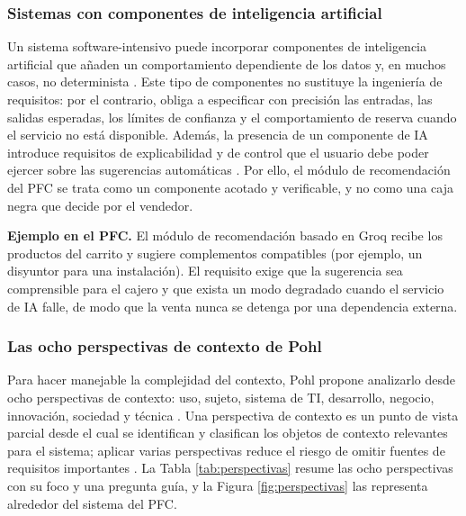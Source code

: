 \documentclass[onecolumn,12pt]{IEEEtran}
\begin{document}
\subsubsection{Sistemas con componentes de inteligencia artificial}
Un sistema software-intensivo puede incorporar componentes de inteligencia artificial que a\~naden un comportamiento dependiente de los datos y, en muchos casos, no determinista \cite{pohl2025,swebok4}. Este tipo de componentes no sustituye la ingenier\'ia de requisitos: por el contrario, obliga a especificar con precisi\'on las entradas, las salidas esperadas, los l\'imites de confianza y el comportamiento de reserva cuando el servicio no est\'a disponible. Adem\'as, la presencia de un componente de IA introduce requisitos de explicabilidad y de control que el usuario debe poder ejercer sobre las sugerencias autom\'aticas \cite{swebok4}. Por ello, el m\'odulo de recomendaci\'on del PFC se trata como un componente acotado y verificable, y no como una caja negra que decide por el vendedor.

\textbf{Ejemplo en el PFC.} El m\'odulo de recomendaci\'on basado en Groq recibe los productos del carrito y sugiere complementos compatibles (por ejemplo, un disyuntor para una instalaci\'on). El requisito exige que la sugerencia sea comprensible para el cajero y que exista un modo degradado cuando el servicio de IA falle, de modo que la venta nunca se detenga por una dependencia externa.

\subsubsection{Las ocho perspectivas de contexto de Pohl}
Para hacer manejable la complejidad del contexto, Pohl propone analizarlo desde ocho perspectivas de contexto: uso, sujeto, sistema de TI, desarrollo, negocio, innovaci\'on, sociedad y t\'ecnica \cite{pohl2025}. Una perspectiva de contexto es un punto de vista parcial desde el cual se identifican y clasifican los objetos de contexto relevantes para el sistema; aplicar varias perspectivas reduce el riesgo de omitir fuentes de requisitos importantes \cite{pohl2025}. La Tabla \ref{tab:perspectivas} resume las ocho perspectivas con su foco y una pregunta gu\'ia, y la Figura \ref{fig:perspectivas} las representa alrededor del sistema del PFC.
\end{document}
